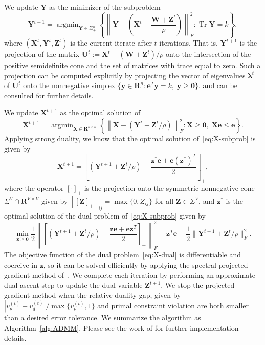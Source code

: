 \documentclass[twoside,11pt]{article}
\newcommand{\R}{\mathbf{R}}
\newcommand{\Z}{\bs{Z}}
\DeclareMathOperator*{\argmin}{\arg\min}
\DeclareMathOperator{\tr}{{Tr}}
\newcommand{\e}{\bs {e}}
\newcommand{\bs}{\boldsymbol}
\newcommand{\X}{\bs {X}}
\newcommand{\y}{\bs {y}}
\newcommand{\Y}{\bs {Y}}
\newcommand{\W}{\bs {W}}
\newcommand{\z}{\bs{z}}
\newcommand{\0}{\bs{0}}
\newcommand{\sbra}[1] {\ensuremath{ \left[ #1\right]}} %
\newcommand{\rbra}[1]{\ensuremath{\left( #1 \right)}} %
\newcommand{\bra}[1]{\ensuremath{\left\{ #1 \right\}}} %
\begin{document}
We update $\Y$ as the minimizer of the subproblem
\begin{equation}\label{eq: Y subprob}
	\Y^{t+1} = \argmin_{\Y \in \Sigma^n_+} \bra{  \left\| \Y - \rbra{ \X^t - \frac{\W + \Z^t}{\rho}}\right\|^2_F : \tr \Y = k},
\end{equation}
where $(\X^t, \Y^t, \Z^t)$ is the current iterate after $t$ iterations.
That is, $\Y^{t+1}$ is the projection of the matrix $\bs{U}^t := \X^t - (\W + \Z^t)/\rho$ onto the intersection of the positive semidefinite cone and the set of matrices with trace equal to zero.
Such a projection can be computed explicitly by projecting the vector of eigenvalues $\bs{\lambda}^t$ of $\bs{U}^t$ onto the nonnegative simplex $\{\y \in \R^n: \e^T \y = k, \; \y \ge \bs 0\}$.
\citet[Proposition~2.6] {zhang2011penalty} and \citet{van2008probing} can be consulted for further details.

We update $\X^{t+1}$ as the optimal solution of
\begin{equation}\label{eq:X-subprob}
	\X^{t+1} = \argmin_{\X \in \R^{n\times n}} \bra{ \left\|\X - \rbra{\Y^t + \Z^t/\rho} \right\|^2_F: \X \ge \0, \; \X \e \le \e }.
\end{equation}
Applying strong duality, we know that the optimal solution of~\eqref{eq:X-subprob} is given by
\begin{equation}\label{eq:X-formula}
	\X^{t+1} = \sbra{ \rbra{\Y^{t+1} + \Z^t/\rho} - \frac{\z^* \e + \e (\z^*)^T}{2}}_+,
\end{equation}
where the operator $[\cdot]_+$ is the projection onto the symmetric nonnegative cone $\Sigma^V \cap \R^{V\times V}_+$ given by $[[\Z]_+]_{ij} = \max \{0, Z_{ij}\}$ for all $\Z \in \Sigma^V$, and $\z^*$ is the optimal solution of the dual problem of~\eqref{eq:X-subprob} given by
\begin{equation}\label{eq:X-dual}
	\min_{\z \ge \0} \frac{1}{2} \left\|\sbra{ \rbra{\Y^{t+1} + \Z^t/\rho} - \frac{\z \e + \e \z^T}{2}}_+ \right\|_F^2 + \z^T \e - \frac{1}{2} \|\Y^{t+1} + \Z^t/\rho \|^2_F.
\end{equation}
The objective function of the dual problem~\eqref{eq:X-dual} is differentiable and coercive in $\z$, so it can be solved efficiently by applying the spectral projected gradient method of~\cite{birgin2000nonmonotone}.
We complete each iteration by performing an approximate dual ascent step to update the dual variable $\Z^{t+1}$.
We stop the projected gradient method when the relative duality gap, given by $|v_p^{(t)} - v_d^{(t)}|/\max\{v_p^{(t)}, 1\}$ and primal constraint violation are both smaller than a desired error tolerance.
We summarize the algorithm as Algorithm~\ref{alg:ADMM}.
Please see the work of \citet[Section 6]{ames2014guaranteed} for further implementation details.
\end{document}
